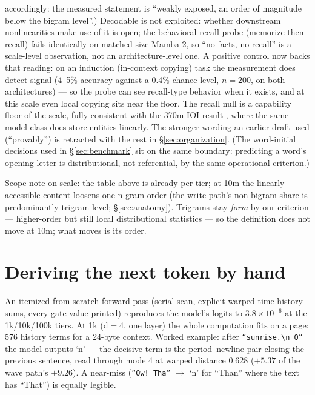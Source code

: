 \documentclass[11pt]{article}
\begin{document}
accordingly: the measured statement is ``weakly exposed, an order of
magnitude below the bigram level''.)
Decodable is not exploited: whether downstream
nonlinearities make use of it is open; the behavioral recall probe
(memorize-then-recall) fails identically on matched-size Mamba-2, so ``no
facts, no recall'' is a scale-level observation, not an architecture-level
one. A positive control now backs that reading: on an induction
(in-context copying) task the measurement does detect signal
(4--5\% accuracy against a 0.4\% chance level, $n{=}200$, on both
architectures) --- so the probe can see recall-type behavior when it
exists, and at this scale even local copying sits near the floor. The
recall null is a capability floor of the scale, fully consistent with the
370m IOI result \cite{ioi-mamba}, where the same model class does store
entities linearly. The stronger wording an earlier draft used (``provably'') is
retracted with the rest in \S\ref{sec:organization}.
(The word-initial decisions used in \S\ref{sec:benchmark} sit on the same
boundary: predicting a word's opening letter is distributional, not
referential, by the same operational criterion.)

Scope note on scale: the table above is already per-tier; at 10m the
linearly accessible content loosens one n-gram order (the write path's
non-bigram share is predominantly trigram-level; \S\ref{sec:anatomy}).
Trigrams stay \emph{form} by our criterion --- higher-order but still
local distributional statistics --- so the definition does not move at
10m; what moves is its order.

\section{Deriving the next token by hand}
\label{sec:hand}

An itemized from-scratch forward pass (serial scan, explicit warped-time
history sums, every gate value printed) reproduces the model's logits to
$3.8 \times 10^{-6}$ at the 1k/10k/100k tiers. At 1k (d$=$4, one layer)
the whole computation fits on a page: 576 history terms for a 24-byte
context. Worked example: after \texttt{``sunrise.\textbackslash n O''} the
model outputs `n' --- the decisive term is the period--newline pair closing the
previous sentence, read through mode 4 at warped distance 0.628 ($+5.37$ of the wave path's
$+9.26$). A near-miss (\texttt{"`Ow! Tha"'} $\to$ `n' for ``Than'' where
the text has ``That'') is equally legible.
\end{document}
